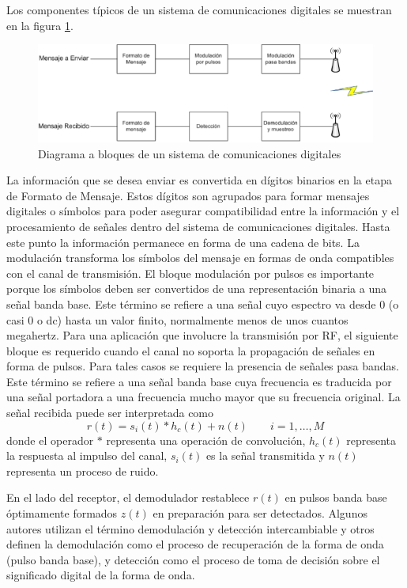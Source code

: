 Los componentes t\'ipicos de un sistema de comunicaciones digitales se muestran
en la figura \ref{fig:siscom}.

\begin{figure}[hpt]
\centering
	\includegraphics[width=5.5in]{figs/siscom}
	\caption{Diagrama a bloques de un sistema de comunicaciones digitales}
	\label{fig:siscom}
\end{figure}

La informaci\'on que se desea enviar es convertida en d\'igitos binarios en la
etapa de Formato de Mensaje. Estos d\'igitos son agrupados para formar mensajes
digitales o s\'imbolos para poder asegurar compatibilidad entre la informaci\'on
y el procesamiento de se\~nales dentro del sistema de comunicaciones digitales.
Hasta este punto la informaci\'on permanece en forma de una cadena de bits. La
modulaci\'on transforma los s\'imbolos del mensaje en formas de onda compatibles
con el canal de transmisi\'on. El bloque modulaci\'on por pulsos es importante
porque los s\'imbolos deben ser convertidos de una representaci\'on binaria a
una se\~nal banda base. Este t\'ermino se refiere a una se\~nal cuyo espectro
va desde 0 (o casi 0 o dc) hasta un valor finito, normalmente menos de unos
cuantos megahertz. Para una aplicaci\'on que involucre la transmisi\'on por RF, el
siguiente bloque es requerido cuando el canal no soporta la propagaci\'on de
se\~nales en forma de pulsos. Para tales casos se requiere la presencia de
se\~nales pasa bandas. Este t\'ermino se refiere a una se\~nal banda base cuya
frecuencia es traducida por una se\~nal portadora a una frecuencia mucho mayor
que su frecuencia original. La se\~nal recibida puede ser interpretada como
\begin{equation}\label{eq:mod}
r(t)=s_i(t)*h_c(t)+n(t) \qquad i=1,\ldots,M
\end{equation}
donde el operador $*$ representa una operaci\'on de convoluci\'on, $h_c(t)$
representa la respuesta al impulso del canal, $s_i(t)$ es la se\~nal transmitida
y $n(t)$ representa un proceso de ruido.

En el lado del receptor, el demodulador restablece $r(t)$ en pulsos banda base
\'optimamente formados $z(t)$ en preparaci\'on para ser detectados. Algunos
autores utilizan el t\'ermino demodulaci\'on y detecci\'on intercambiable y
otros definen la demodulaci\'on como el proceso de recuperaci\'on de la forma de
onda (pulso banda base), y detecci\'on como el proceso de toma de decisi\'on
sobre el significado digital de la forma de onda.

